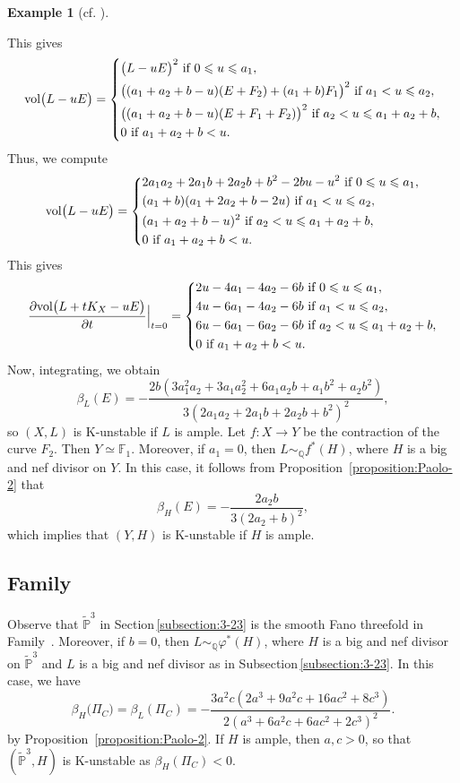 \documentclass[12pt]{amsart}
\theoremstyle{definition}
\newtheorem{example}[theorem]{Example}
\theoremstyle{remark}
\begin{document}
\begin{example}[{cf.  \cite{CheltsovMartinez-Garcia}}]
\begin{itemize}
\end{itemize}
This gives
$$
\mathrm{vol}\big(L-uE\big)=
\left\{\aligned
&\big(L-uE\big)^2\ \text{if $0\leqslant u\leqslant a_1$}, \\
&\big((a_1+a_2+b-u)(E+F_2)+(a_1+b)F_1\big)^2\ \text{if $a_1<u\leqslant a_2$},\\
&\big((a_1+a_2+b-u)(E+F_1+F_2)\big)^2\ \text{if $a_2<u\leqslant a_1+a_2+b$},\\
&0\ \text{if $a_1+a_2+b<u$}.
\endaligned
\right.
$$
Thus, we compute
$$
\mathrm{vol}\big(L-uE\big)=
\left\{\aligned
&2a_1a_2+2a_1b+2a_2b+b^2-2bu-u^2\ \text{if $0\leqslant u\leqslant a_1$}, \\
&(a_1+b)(a_1+2a_2+b-2u)\ \text{if $a_1<u\leqslant a_2$},\\
&(a_1+a_2+b-u)^2\ \text{if $a_2<u\leqslant a_1+a_2+b$},\\
&0\ \text{if $a_1+a_2+b<u$}.
\endaligned
\right.
$$
This gives
$$
\frac{\partial \mathrm{vol}\big(L+tK_X-uE\big)}{\partial t}\Big\vert_{t=0}=
\left\{\aligned
&2u-4a_1-4a_2-6b\ \text{if $0\leqslant u\leqslant a_1$},\\
&4u-6a_1-4a_2-6b\ \text{if $a_1<u\leqslant a_2$},\\
&6u-6a_1-6a_2-6b\ \text{if $a_2<u\leqslant a_1+a_2+b$},\\
&0\ \text{if $a_1+a_2+b<u$}.
\endaligned
\right.
$$
Now, integrating, we obtain
$$
\beta_L(E)=-\frac{2b(3a_1^2a_2+3a_1a_2^2+6a_1a_2b+a_1b^2+a_2b^2)}{3(2a_1a_2+2a_1b+2a_2b+b^2)^2},
$$
so $(X,L)$ is K-unstable if $L$ is ample. Let $f\colon X\to Y$ be the contraction of the curve $F_2$. Then $Y\simeq\mathbb{F}_1$. Moreover, if $a_1=0$, then $L\sim_{\mathbb{Q}}f^*(H)$, where $H$ is a big and nef divisor on $Y$. In this case, it follows from Proposition~\ref{proposition:Paolo-2} that
$$
\beta_H(E)=-\frac{2a_2b}{3(2a_2+b)^2},
$$
which implies that $(Y,H)$ is K-unstable if $H$ is ample.
\end{example}

\subsection{Family }
\label{subsection:2-30}
Observe that $\widetilde{\mathbb{P}}^3$ in Section\,\ref{subsection:3-23} is the smooth Fano threefold in Family~. Moreover, if $b=0$, then $L\sim_{\mathbb{Q}} \varphi^*(H)$,
where $H$ is a big and nef divisor on $\widetilde{\mathbb{P}}^3$ and $L$ is a big and nef divisor as in Subsection\,\ref{subsection:3-23}. In this case, we have
$$
\beta_H\big(\Pi_C\big)=\beta_L(\Pi_C)=-\frac{3a^2c(2a^3+9a^2c+16ac^2+8c^3)}{2(a^3+6a^2c+6ac^2+2c^3)^2}.
$$
by Proposition~\ref{proposition:Paolo-2}. If $H$ is ample, then $a, c>0$, so that $(\widetilde{\mathbb{P}}^3,H)$ is K-unstable as $\beta_H(\Pi_C)<0$.
\end{document}

